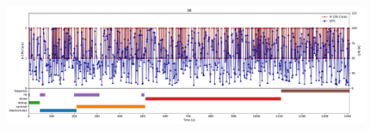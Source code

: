 \documentclass[11pt]{article}
\begin{document}
\begin{enumerate}
\begin{center}
    \end{center}
    \begin{center}
    {\includegraphics[width=0.9\textwidth]{plot2/3B.pdf}}
    \end{center}
    
\end{enumerate}
\end{document}
